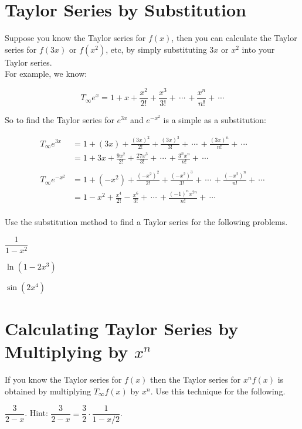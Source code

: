 \documentclass[paper=letter, 11pt]{article}
\begin{document}
\section*{Taylor Series by Substitution}

Suppose you know the Taylor series for $f(x)$, then you can calculate the Taylor series for $f(3x)$ or $f(x^2)$, etc, by simply substituting $3x$ or $x^2$ into your Taylor series.\\

For example, we know:

\[ T_{\infty} e^x = 1 + x + \dfrac{x^2}{2!} + \frac{x^3}{3!} + \,\cdots\, +  \frac{x^n}{n!} + \, \cdots \]

So to find the Taylor series for $e^{3x}$ and $e^{-x^2}$ is a simple as a substitution:

\begin{align*}
T_{\infty} e^{3x} &= 1 + (3x) + \frac{(3x)^2}{2!} + \frac{(3x)^3}{3!} + \,\cdots\, + \frac{(3x)^n}{n!} + \,\cdots \\
 &= 1 + 3x + \frac{9x^2}{2!} + \frac{27x^3}{3!} + \,\cdots\, + \frac{3^n x^n}{n!} + \,\cdots \\
 & \\
T_{\infty} e^{-x^2} &= 1 + (-x^2) + \frac{(-x^2)^2}{2!} + \frac{(-x^2)^3}{3!} + \,\cdots\, + \frac{(-x^2)^n}{n!} + \,\cdots \\
 &= 1 - x^2 + \frac{x^4}{2!} - \frac{x^6}{3!} + \,\cdots\, + \frac{(-1)^nx^{2n}}{n!} + \,\cdots \\
\end{align*}

\newpage

Use the substitution method to find a Taylor series for the following problems.

\Prob $\dfrac{1}{1 - x^2}$\vfill

\Prob $\ln(1 - 2x^3)$\vfill

\Prob $\sin(2x^4)$\vfill

\newpage

\section*{Calculating Taylor Series by Multiplying by $x^n$}

If you know the Taylor series for $f(x)$ then the Taylor series for $x^nf(x)$ is obtained by multiplying $T_{\infty}f(x)$ by $x^n$.  Use this technique for the following.\bigskip

\Prob $\dfrac{3}{2 - x}$. \quad Hint:\,\,$\dfrac{3}{2 - x} = \dfrac{3}{2}\cdot \dfrac{1}{1 - x/2}$.\vfill
\end{document}
